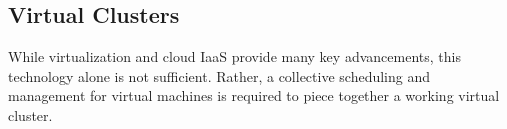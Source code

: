  








\subsection{Virtual Clusters}

While virtualization and cloud IaaS provide many key advancements, this technology alone is not sufficient.  Rather, a collective scheduling and management for virtual machines is required to piece together a working virtual cluster.  

